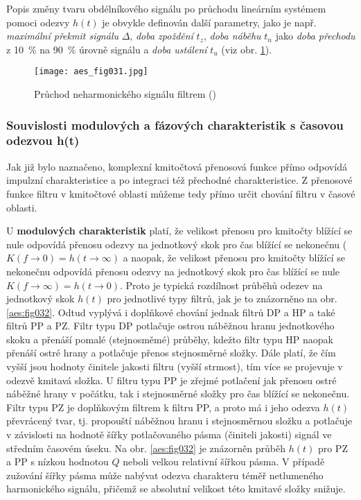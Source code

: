      Popis změny tvaru obdélníkového signálu po průchodu lineárním systémem pomoci odezvy \(h(t)\)
      je obvykle definován další parametry, jako je např. \emph{maximální překmit signálu}
      \(\Delta\), \emph{doba zpoždění} \(t_z\), \emph{doba náběhu} \(t_n\) jako \emph{doba přechodu}
      z \SI{10}{\percent} na \SI{90}{\percent} úrovně signálu a \emph{doba ustálení} \(t_u\) (viz
      obr. \ref{aes:fig031}). 

      \begin{figure}[ht!]
        \centering
        \texttt{[image: aes\_fig031.jpg]}
        \caption{Průchod neharmonického signálu filtrem (\cite[s.~31]{HajekSedlacek2002})}
        \label{aes:fig031}    
      \end{figure}

      \subsubsection{Souvislosti modulových a fázových charakteristik s časovou odezvou h(t)}
        Jak již bylo naznačeno, komplexní kmitočtová přenosová funkce přímo odpovídá impulzní
        charakteristice a po integraci též přechodné charakteristice. Z přenosové funkce filtru v
        kmitočtové oblasti můžeme tedy přímo určit chování filtru v časové oblasti. 
        
        U \textbf{modulových charakteristik} platí, že velikost přenosu pro kmitočty blížící se nule
        odpovídá přenosu odezvy na jednotkový skok pro čas blížící se nekonečnu (\(K(f\rightarrow0)
        = h(t\rightarrow \infty)\) a naopak, že velikost přenosu pro kmitočty blížící se nekonečnu
        odpovídá přenosu odezvy na jednotkový skok pro čas blížící se nule \(K(f\rightarrow\infty) =
        h(t\rightarrow0)\). Proto je typická rozdílnost  průběhů odezev na jednotkový skok \(h(t)\)
        pro jednotlivé typy filtrů, jak je to znázorněno na obr. \ref{aes:fig032}. Odtud vyplývá i
        doplňkové chování jednak filtrů DP a HP a také filtrů PP a PZ. Filtr typu DP potlačuje
        ostrou náběžnou hranu jednotkového skoku a přenáší pomalé (stejnosměmé) průběhy, kdežto
        filtr typu HP naopak přenáší ostré hrany a potlačuje přenos stejnosměrné složky. Dále platí,
        že čím vyšší jsou hodnoty činitele jakosti filtru (vyšší strmost), tím více se projevuje v
        odezvě kmitavá složka. U filtru typu PP je zřejmé potlačení jak přenosu ostré náběžné hrany
        v počátku, tak i stejnosměrné složky pro čas blížící se nekonečnu. Filtr typu PZ je
        doplňkovým filtrem k filtru PP, a proto má i jeho odezva \(h(t)\) převrácený tvar, tj.
        propouští náběžnou hranu i stejnosměrnou složku a potlačuje v závislosti na hodnotě šířky
        potlačovaného pásma (činiteli jakosti) signál ve středním časovém úseku. Na obr.
        \ref{aes:fig032} je znázorněn průběh \(h(t)\) pro PZ a PP s nízkou hodnotou \(Q\) neboli
        velkou relativní šířkou pásma. V případě zužování šířky pásma může nabývat odezva charakteru
        téměř netlumeného harmonického signálu, přičemž se absolutní velikost této kmitavé složky
        snižuje.

